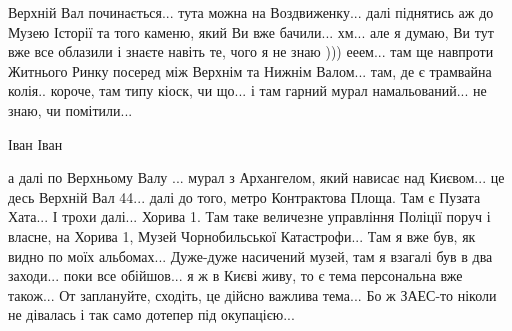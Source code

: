 Верхній Вал починається... тута можна на Воздвиженку... далі піднятись аж до
Музею Історії та того каменю, який Ви вже бачили... хм... але я думаю, Ви тут
вже все облазили і знаєте навіть те, чого я не знаю ))) ееем... там ще навпроти
Житнього Ринку посеред між Верхнім та Нижнім Валом... там, де є трамвайна
колія.. короче, там типу кіоск, чи що... і там гарний мурал намальований... не
знаю, чи помітили...

Іван Іван

а далі по Верхньому Валу ... мурал з Архангелом, який нависає над Києвом... це
десь Верхній Вал 44... далі до того, метро Контрактова Площа. Там є Пузата
Хата... І трохи далі... Хорива 1. Там таке величезне управління Поліції поруч і
власне, на Хорива 1, Музей Чорнобильської Катастрофи... Там я вже був, як видно
по моїх альбомах... Дуже-дуже насичений музей, там я взагалі був в два
заходи... поки все обійшов... я ж в Києві живу, то є тема персональна вже
також... От заплануйте, сходіть, це дійсно важлива тема... Бо ж ЗАЕС-то ніколи
не дівалась і так само дотепер під окупацією...
